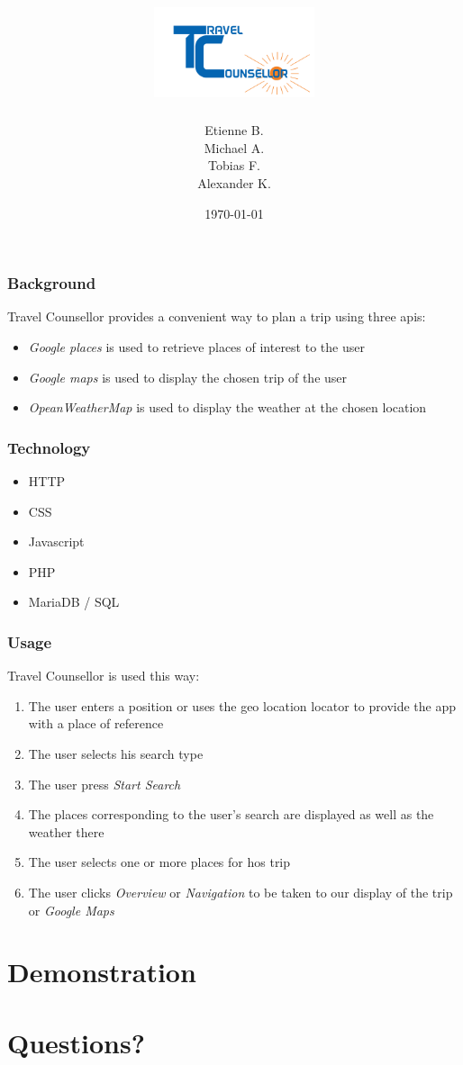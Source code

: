 \documentclass{beamer}
\title{\hspace{60px}\includegraphics[height=100px]{resources/logo.png}}
\institute{University of Innsbruck}
\date{\today}
\institute{Innsbruck University}
\author[Etienne Bertin]{Etienne B. \\ Michael A.\\ Tobias F.\\ Alexander K.}
\begin{document}
\begin{frame}
	\titlepage
\end{frame}


\begin{frame}
	\frametitle{Background}
	Travel Counsellor provides a convenient way to plan a trip using three apis:
	\begin{itemize}
		\item \textit{Google places} is used to retrieve places of interest to the user
		\item \textit{Google maps} is used to display the chosen trip of the user
		\item \textit{OpeanWeatherMap} is used to display the weather at the chosen location
	\end{itemize}
\end{frame}


\begin{frame}
	\frametitle{Technology}
	\begin{itemize}
		\item HTTP
		\item CSS
		\item Javascript
		\item PHP
		\item MariaDB / SQL
	\end{itemize}
\end{frame}


\begin{frame}
	\frametitle{Usage}
	Travel Counsellor is used this way:
	\begin{enumerate}
		\item The user enters a position or uses the geo location locator to provide the app with a place of reference
		\item The user selects his search type
		\item The user press \textit{Start Search}
		\item The places corresponding to the user's search are displayed as well as the weather there
		\item The user selects one or more places for hos trip
		\item The user clicks \textit{Overview} or \textit{Navigation} to be taken to our display of the trip or \textit{Google Maps}
	\end{enumerate}
\end{frame}


\section{Demonstration}
\section{Questions?}
\end{document}
